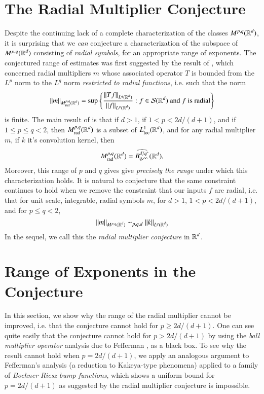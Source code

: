 \section{The Radial Multiplier Conjecture}

Despite the continuing lack of a complete characterization of the classes $M^{p,q}(\operatorname{\mathbb{R}}^d)$, it is surprising that we \emph{can} conjecture a characterization of the subspace of $M^{p,q}(\operatorname{\mathbb{R}}^d)$ consisting of \emph{radial symbols}, for an appropriate range of exponents. The conjectured range of estimates was first suggested by the result of \cite{GarrigosandSeeger}, which concerned radial multipliers $m$ whose associated operator $T$ is bounded from the $L^p$ norm to the $L^q$ norm \emph{restricted to radial functions}, i.e. such that the norm
%
\[ \| m \|_{M^{p,q}_{\text{rad}}(\operatorname{\mathbb{R}}^d)} = \sup \left\{ \frac{\| Tf \|_{L^q(\operatorname{\mathbb{R}}^d)}}{\| f \|_{L^p(\operatorname{\mathbb{R}}^d)}} : f \in \mathcal{S}(\operatorname{\mathbb{R}}^d)\ \text{and $f$ is radial} \right\} \]
%
is finite. The main result of \cite{GarrigosandSeeger} is that if $d > 1$, if $1 < p < 2d/(d+1)$, and if $1 \leq p \leq q < 2$, then $M^{p,q}_{\text{rad}}(\operatorname{\mathbb{R}}^d)$ is a subset of $L^1_{\text{loc}}(\operatorname{\mathbb{R}}^d)$, and for any radial multiplier $m$, if $k$ it's convolution kernel, then
%
\[ M^{p,q}_{\text{rad}}(\operatorname{\mathbb{R}}^d) = \widehat{B^{d/q^*}_{q,\infty}}(\operatorname{\mathbb{R}}^d), \]
%
%
%
%
Moreover, this range of $p$ and $q$ gives give \emph{precisely the range} under which this characterization holds. It is natural to conjecture that the same constraint continues to hold when we remove the constraint that our inputs $f$ are radial, i.e. that for unit scale, integrable, radial symbols $m$, for $d > 1$, $1 < p < 2d/(d+1)$, and for $p \leq q < 2$,
%
\[ \| m \|_{M^{p,q}(\operatorname{\mathbb{R}}^d)} \sim_{p,q,d} \| k \|_{L^q(\operatorname{\mathbb{R}}^d)} \]
%
%
%
In the sequel, we call this the \emph{radial multiplier conjecture} in $\operatorname{\mathbb{R}}^d$.

\section{Range of Exponents in the Conjecture}

In this section, we show why the range of the radial multiplier cannot be improved, i.e. that the conjecture cannot hold for $p \geq 2d/(d+1)$. One can see quite easily that the conjecture cannot hold for $p > 2d/(d+1)$ by using the \emph{ball multiplier operator} analysis due to Fefferman \cite{Fefferman}, as a black box. To see why the result cannot hold when $p = 2d/(d+1)$, we apply an analogous argument to Fefferman's analysis (a reduction to Kakeya-type phenomena) applied to a family of \emph{Bochner-Riesz bump functions}, which shows a uniform bound for $p = 2d/(d+1)$ as suggested by the radial multiplier conjecture is impossible.

